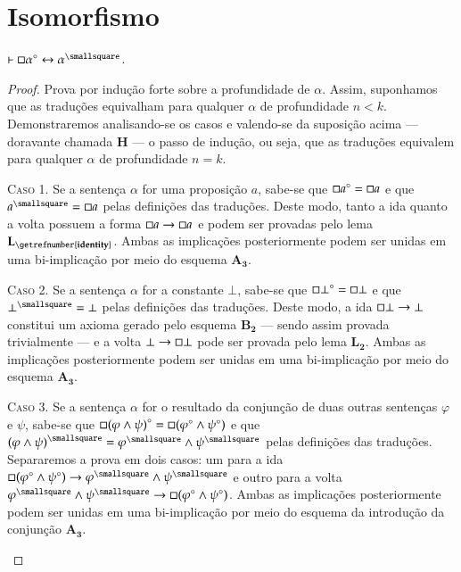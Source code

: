 \section{Isomorfismo}

\begin{theorem}
    $\entails\nec\alpha^\circ\leftrightarrow\alpha^\smallsquare$.

    \begin{proof}
        Prova por indução forte sobre a profundidade de $\alpha$.
        Assim, suponhamos que as traduções equivalham para qualquer $\alpha$ de profundidade $n<k$.
        Demonstraremos analisando-se os casos e valendo-se da suposição acima --- doravante chamada $\mathbf{H}$ --- o passo de indução, ou seja, que as traduções equivalem para qualquer $\alpha$ de profundidade $n=k$.

        \begin{case}
            \textsc{Caso 1.}
            Se a sentença $\alpha$ for uma proposição $a$, sabe-se que $\mathord{\square} a^\circ=\mathord{\square} a$ e que $a^\smallsquare=\nec a$ pelas definições das traduções.
            Deste modo, tanto a ida quanto a volta possuem a forma $\mathord{\square} a\to\mathord{\square} a$ e podem ser provadas pelo lema \hyperref[identity]{$\mathbf{L_\getrefnumber{identity}}$}.
            Ambas as implicações posteriormente podem ser unidas em uma bi-implicação por meio do esquema \hyperref[MA3]{$\mathbf{A_3}$}.
        \end{case}

        \begin{case}
            \textsc{Caso 2.}
            Se a sentença $\alpha$ for a constante $\bot$, sabe-se que $\mathord{\square}\bot^\circ=\mathord{\square}\bot$ e que $\bot^\smallsquare=\bot$ pelas definições das traduções.
            Deste modo, a ida $\mathord{\square}\bot\to\bot$ constitui um axioma gerado pelo esquema \hyperref[MB2]{$\mathbf{B_2}$} --- sendo assim provada trivialmente --- e a volta $\bot\to\mathord{\square}\bot$ pode ser provada pelo lema \hyperref[explosion]{$\mathbf{L_2}$}.
            Ambas as implicações posteriormente podem ser unidas em uma bi-implicação por meio do esquema \hyperref[MA3]{$\mathbf{A_3}$}.
        \end{case}

        \begin{case}
            \textsc{Caso 3.}
            Se a sentença $\alpha$ for o resultado da conjunção de duas outras sentenças $\varphi$ e $\psi$, sabe-se que $\mathord{\square}{(\varphi\wedge\psi)}^\circ=\mathord{\square}(\varphi^\circ\wedge\psi^\circ)$ e que ${(\varphi\wedge\psi)}^\smallsquare=\varphi^\smallsquare\wedge\psi^\smallsquare$ pelas definições das traduções.
            Separaremos a prova em dois casos: um para a ida $\nec(\varphi^\circ\wedge\psi^\circ)\to\varphi^\smallsquare\wedge\psi^\smallsquare$ e outro para a volta $\varphi^\smallsquare\wedge\psi^\smallsquare\to\nec(\varphi^\circ\wedge\psi^\circ)$. Ambas as implicações posteriormente podem ser unidas em uma bi-implicação por meio do esquema da introdução da conjunção \hyperref[MA3]{$\mathbf{A_3}$}.
        \end{case}


\end{proof}
\end{theorem}
